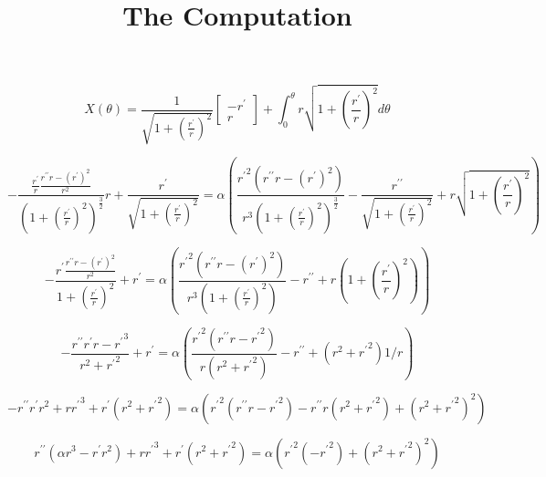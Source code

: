 \documentclass[12pt, a4paper]{report}
\title{The Computation}
\begin{document}
\maketitle

\begin{equation}
X(\theta) = \frac{1}{\sqrt{1 + \left(\frac{r^\prime}{r}\right)^2}}\begin{bmatrix} -r^\prime \\ r \end{bmatrix} + \int_0^\theta{r\sqrt{1+\left(\frac{r^\prime}{r}\right)^2}d\theta}
\end{equation}

\begin{equation}
-\frac{\frac{r^\prime}{r} \frac{r^{\prime\prime}r - (r^\prime)^2}{r^2}}{({1 + \left(\frac{r^\prime}{r}\right)^2})^\frac{3}{2}}r + \frac{r^\prime}{\sqrt{1 + \left(\frac{r^\prime}{r}\right)^2}} =
\alpha \left(\frac{{r^\prime}^2 (r^{\prime\prime}r - (r^\prime)^2)}{r^3({1 + \left(\frac{r^\prime}{r}\right)^2})^\frac{3}{2}} - \frac{r^{\prime\prime}}{\sqrt{1 + \left(\frac{r^\prime}{r}\right)^2}} + r\sqrt{1+\left(\frac{r^\prime}{r}\right)^2}\right)
\end{equation}

\begin{equation}
-\frac{r^\prime \frac{r^{\prime\prime}r - (r^\prime)^2}{r^2}}{1 + \left(\frac{r^\prime}{r}\right)^2} + r^\prime =
\alpha \left(\frac{{r^\prime}^2 (r^{\prime\prime}r - (r^\prime)^2)}{r^3({1 + \left(\frac{r^\prime}{r}\right)^2})} - r^{\prime\prime} + r(1+\left(\frac{r^\prime}{r}\right)^2)\right)
\end{equation}

\begin{equation}
-\frac{r^{\prime\prime}r^{\prime}r - {r^\prime}^3}{r^2 + {r^\prime}^2} + r^\prime =
\alpha \left(\frac{{r^\prime}^2 (r^{\prime\prime}r - {r^\prime}^2)}{r(r^2 + {r^\prime}^2)} - r^{\prime\prime} + (r^2+{r^\prime}^2)1/r\right)
\end{equation}

\begin{equation}
-r^{\prime\prime}r^{\prime}r^2 + r{r^\prime}^3 + r^\prime(r^2 + {r^\prime}^2) =
\alpha \left({r^\prime}^2 (r^{\prime\prime}r - {r^\prime}^2) - r^{\prime\prime}r(r^2 + {r^\prime}^2) + (r^2+{r^\prime}^2)^2\right)
\end{equation}

\begin{equation}
r^{\prime\prime}\left(\alpha r^3 - r^{\prime}r^2\right) + r{r^\prime}^3 + r^\prime(r^2 + {r^\prime}^2) =
\alpha \left({r^\prime}^2 (- {r^\prime}^2) + (r^2+{r^\prime}^2)^2\right)
\end{equation}
\end{document}
